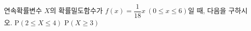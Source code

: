 연속확률변수 $X$의 확률밀도함수가 $f(x)=\dfrac{1}{18}x\ (0\le x\le 6)$일 때, 다음을 구하시오.
 $\mathrm{P}(2\le X\le 4)$
 $\mathrm{P}(X\ge 3)$
